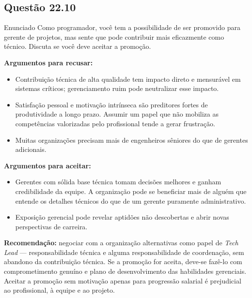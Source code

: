 \documentclass[12pt,a4paper]{article}
\begin{document}
\subsection*{Questão 22.10}
\begin{questao}{Enunciado}
Como programador, você tem a possibilidade de ser promovido para gerente de
projetos, mas sente que pode contribuir mais eficazmente como técnico. Discuta
se você deve aceitar a promoção.
\end{questao}
\begin{resposta}
\textbf{Argumentos para recusar:}
\begin{itemize}[nosep]
  \item Contribuição técnica de alta qualidade tem impacto direto e mensurável
        em sistemas críticos; gerenciamento ruim pode neutralizar esse impacto.
  \item Satisfação pessoal e motivação intrínseca são preditores fortes de
        produtividade a longo prazo. Assumir um papel que não mobiliza as
        competências valorizadas pelo profissional tende a gerar frustração.
  \item Muitas organizações precisam mais de engenheiros sêniores do que
        de gerentes adicionais.
\end{itemize}

\textbf{Argumentos para aceitar:}
\begin{itemize}[nosep]
  \item Gerentes com sólida base técnica tomam decisões melhores e ganham
        credibilidade da equipe. A organização pode se beneficiar mais de
        alguém que entende os detalhes técnicos do que de um gerente puramente
        administrativo.
  \item Exposição gerencial pode revelar aptidões não descobertas e abrir
        novas perspectivas de carreira.
\end{itemize}

\textbf{Recomendação:} negociar com a organização alternativas como papel de
\textit{Tech Lead} — responsabilidade técnica e alguma responsabilidade de
coordenação, sem abandono da contribuição técnica. Se a promoção for aceita,
deve-se fazê-lo com comprometimento genuíno e plano de desenvolvimento
das habilidades gerenciais. Aceitar a promoção sem motivação apenas para
progressão salarial é prejudicial ao profissional, à equipe e ao projeto.
\end{resposta}
\end{document}
